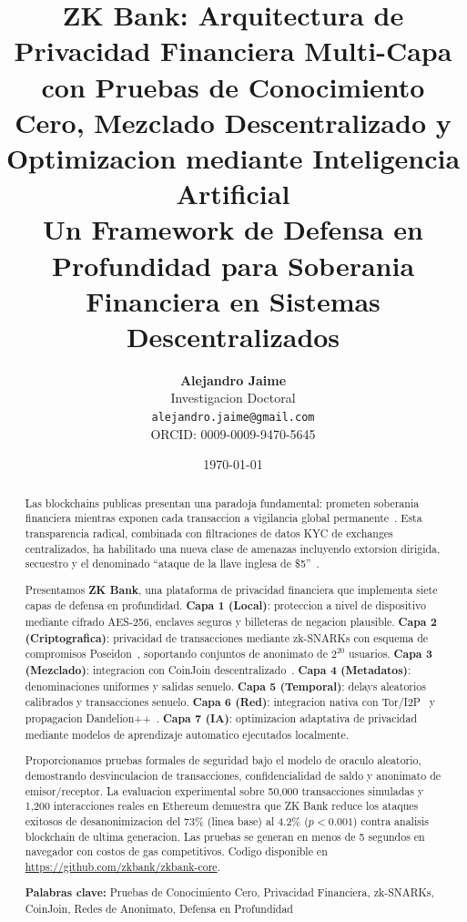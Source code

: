 \documentclass[11pt]{article}
\title{
\textbf{ZK Bank: Arquitectura de Privacidad Financiera Multi-Capa con Pruebas de Conocimiento Cero, Mezclado Descentralizado y Optimizacion mediante Inteligencia Artificial}\\[0.5em]
\large Un Framework de Defensa en Profundidad para Soberania Financiera en Sistemas Descentralizados
}
\author{
\textbf{Alejandro Jaime}\\
Investigacion Doctoral\\
\texttt{alejandro.jaime@gmail.com}\\
ORCID: 0009-0009-9470-5645
}
\date{\today}
\theoremstyle{definition}
\theoremstyle{plain}
\theoremstyle{remark}
\begin{document}
\maketitle

\begin{abstract}
\noindent
Las blockchains publicas presentan una paradoja fundamental: prometen soberania financiera mientras exponen cada transaccion a vigilancia global permanente~\cite{meiklejohn2013fistful}. Esta transparencia radical, combinada con filtraciones de datos KYC de exchanges centralizados, ha habilitado una nueva clase de amenazas incluyendo extorsion dirigida, secuestro y el denominado ``ataque de la llave inglesa de \$5''~\cite{physicalbitcoin2023}.

Presentamos \textbf{ZK Bank}, una plataforma de privacidad financiera que implementa siete capas de defensa en profundidad. \textbf{Capa 1 (Local)}: proteccion a nivel de dispositivo mediante cifrado AES-256, enclaves seguros y billeteras de negacion plausible. \textbf{Capa 2 (Criptografica)}: privacidad de transacciones mediante zk-SNARKs con esquema de compromisos Poseidon~\cite{grassi2021poseidon}, soportando conjuntos de anonimato de $2^{20}$ usuarios. \textbf{Capa 3 (Mezclado)}: integracion con CoinJoin descentralizado~\cite{maxwell2013coinjoin}. \textbf{Capa 4 (Metadatos)}: denominaciones uniformes y salidas senuelo. \textbf{Capa 5 (Temporal)}: delays aleatorios calibrados y transacciones senuelo. \textbf{Capa 6 (Red)}: integracion nativa con Tor/I2P~\cite{dingledine2004tor} y propagacion Dandelion++~\cite{venkatakrishnan2017dandelion}. \textbf{Capa 7 (IA)}: optimizacion adaptativa de privacidad mediante modelos de aprendizaje automatico ejecutados localmente.

Proporcionamos pruebas formales de seguridad bajo el modelo de oraculo aleatorio, demostrando desvinculacion de transacciones, confidencialidad de saldo y anonimato de emisor/receptor. La evaluacion experimental sobre 50,000 transacciones simuladas y 1,200 interacciones reales en Ethereum demuestra que ZK Bank reduce los ataques exitosos de desanonimizacion del 73\% (linea base) al 4.2\% ($p<0.001$) contra analisis blockchain de ultima generacion. Las pruebas se generan en menos de 5 segundos en navegador con costos de gas competitivos. Codigo disponible en \url{https://github.com/zkbank/zkbank-core}.

\vspace{0.5em}
\noindent\textbf{Palabras clave:} Pruebas de Conocimiento Cero, Privacidad Financiera, zk-SNARKs, CoinJoin, Redes de Anonimato, Defensa en Profundidad
\end{abstract}
\end{document}
